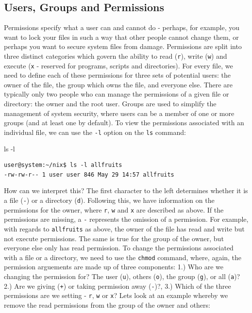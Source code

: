 \documentclass[11pt]{article}
\begin{document}
\subsection{Users, Groups and Permissions}

Permissions  specify what a user can and cannot do - perhaps, for example, you want to lock your files in such a way that other people cannot change them, or perhaps you want to secure system files from damage. Permissions are split into three distinct categories which govern the ability to read (\texttt{r}), write (\texttt{w}) and execute (\texttt{x} - reserved for programs, scripts and directories). For every file, we need to define each of these permissions for three sets of potential users: the owner of the file, the group which owns the file, and everyone else. There are typically only two people who can manage the permissions of a given file or directory: the owner and the root user. Groups are used to simplify the management of system security, where users can be a member of one or more groups (and at least one by default). To view the permissions associated with an individual file, we can use the \texttt{-l} option on the \texttt{ls} command:\\

\begin{listing}[H]
\caption{ls -l}\vspace{-0.1in}
\begin{verbatim}
user@system:~/nix$ ls -l allfruits
-rw-rw-r-- 1 user user 846 May 29 14:57 allfruits
\end{verbatim}
\end{listing}

How can we interpret this? The first character to the left determines whether it is a file (\texttt{-}) or a directory (\texttt{d}).  Following this, we have information on the permissions for the owner, where \texttt{r}, \texttt{w} and \texttt{x} are described as above. If the permissions are missing, a \texttt{-} represents the omission of a permission. For example, with regards to \texttt{allfruits} as above, the owner of the file has read and write but not execute permissions. The same is true for the group of the owner, but everyone else only has read permission. To change the permissions associated with a file or a directory, we need to use the \texttt{chmod} command, where, again, the permission arguements are made up of three components: 1.) Who are we changing the permission for? The user (\texttt{u}), others (\texttt{o}), the group (\texttt{g}), or all (\texttt{a})? 2.) Are we giving (\texttt{+}) or taking permission away (\texttt{-})?, 3.) Which of the three permissions are we setting - \texttt{r}, \texttt{w} or \texttt{x}? Lets look at an example whereby we remove the read permissions from the group of the owner and others:\\
\end{document}
